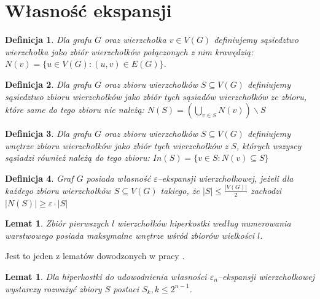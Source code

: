 \documentclass{pracamgr}
\newtheorem{defi}{Definicja}[section]
\newtheorem{lemma}[theorem]{Lemat}
\begin{document}
  \section{Własność ekspansji}
   \begin{defi}\label{sasiedztwo wierzcholka}
    Dla grafu $G$ oraz wierzchołka $v\in V(G)$ definiujemy \emph{sąsiedztwo wierzchołka} jako zbiór wierzchołków połączonych z nim krawędzią:
    $N(v)=\{u\in V(G):(u,v)\in E(G)\}$.
   \end{defi}
   \begin{defi}\label{sasiedztwo zbioru wierzcholkow}%
    Dla grafu $G$ oraz zbioru wierzchołków $S\subseteq V(G)$ definiujemy \emph{sąsiedztwo zbioru wierzchołków} jako zbiór tych sąsiadów wierzchołków ze zbioru,
    które same do tego zbioru nie należą: $N(S)=(\bigcup_{v\in S}N(v))\backslash S$
   \end{defi}
   \begin{defi}\label{wnetrze zbioru wierzcholkow}
    Dla grafu $G$ oraz zbioru wierzchołków $S\subseteq V(G)$ definiujemy \emph{wnętrze zbioru wierzchołków} jako zbiór tych wierzchołków z $S$,
    których wszyscy sąsiadzi również należą do tego zbioru: $In(S)=\{v\in S:N(v)\subseteq S\}$
   \end{defi}
   \begin{defi}\label{epsilon ekspansja wierzcholkowa}
    Graf $G$ posiada własność \emph{$\varepsilon$--ekspansji wierzchołkowej}, jeżeli dla każdego zbioru wierzchołków $S\subseteq V(G)$ takiego,
    że $|S|\le\frac{|V(G)|}{2}$ zachodzi $|N(S)|\ge\varepsilon\cdot|S|$
   \end{defi}
   \begin{lemma}
    Zbiór pierwszych $l$ wierzchołków hiperkostki według numerowania warstwowego posiada maksymalne wnętrze wśród zbiorów wielkości $l$.  
   \end{lemma}\label{HAR1}
   Jest to jeden z lematów dowodzonych w pracy \cite{HAR}.
   \begin{lemma}\label{S->S_k}%
    Dla hiperkostki do udowodnienia własności $\varepsilon_n$--ekspansji wierzchołkowej wystarczy rozważyć zbiory $S$ postaci $S_k,k\le 2^{n-1}$.
   \end{lemma}
\end{document}
